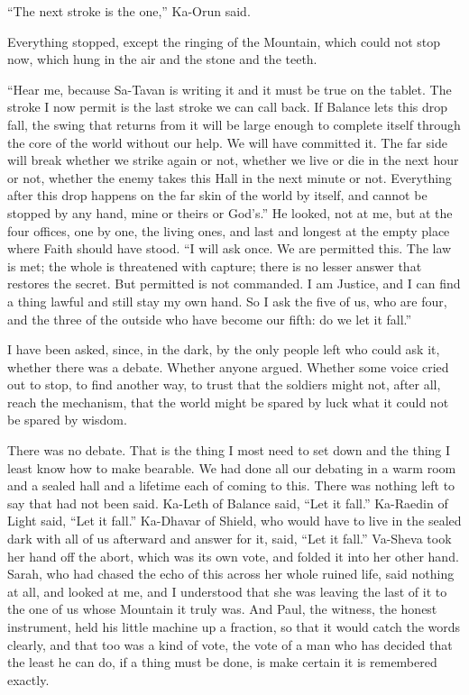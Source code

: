 ``The next stroke is the one,'' Ka-Orun said.\par

Everything stopped, except the ringing of the Mountain, which could not stop now, which hung in the air and the stone and the teeth.\par

``Hear me, because Sa-Tavan is writing it and it must be true on the tablet. The stroke I now permit is the last stroke we can call back. If Balance lets this drop fall, the swing that returns from it will be large enough to complete itself through the core of the world without our help. We will have committed it. The far side will break whether we strike again or not, whether we live or die in the next hour or not, whether the enemy takes this Hall in the next minute or not. Everything after this drop happens on the far skin of the world by itself, and cannot be stopped by any hand, mine or theirs or God's.'' He looked, not at me, but at the four offices, one by one, the living ones, and last and longest at the empty place where Faith should have stood. ``I will ask once. We are permitted this. The law is met; the whole is threatened with capture; there is no lesser answer that restores the secret. But permitted is not commanded. I am Justice, and I can find a thing lawful and still stay my own hand. So I ask the five of us, who are four, and the three of the outside who have become our fifth: do we let it fall.''\par

I have been asked, since, in the dark, by the only people left who could ask it, whether there was a debate. Whether anyone argued. Whether some voice cried out to stop, to find another way, to trust that the soldiers might not, after all, reach the mechanism, that the world might be spared by luck what it could not be spared by wisdom.\par

There was no debate. That is the thing I most need to set down and the thing I least know how to make bearable. We had done all our debating in a warm room and a sealed hall and a lifetime each of coming to this. There was nothing left to say that had not been said. Ka-Leth of Balance said, ``Let it fall.'' Ka-Raedin of Light said, ``Let it fall.'' Ka-Dhavar of Shield, who would have to live in the sealed dark with all of us afterward and answer for it, said, ``Let it fall.'' Va-Sheva took her hand off the abort, which was its own vote, and folded it into her other hand. Sarah, who had chased the echo of this across her whole ruined life, said nothing at all, and looked at me, and I understood that she was leaving the last of it to the one of us whose Mountain it truly was. And Paul, the witness, the honest instrument, held his little machine up a fraction, so that it would catch the words clearly, and that too was a kind of vote, the vote of a man who has decided that the least he can do, if a thing must be done, is make certain it is remembered exactly.\par

